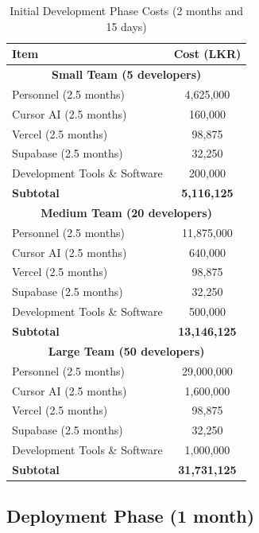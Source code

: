 \documentclass[12pt,a4paper]{article}
\begin{document}
\begin{table}[H]
\centering
\begin{tabular}{|l|c|}
\hline
\textbf{Item} & \textbf{Cost (LKR)} \\
\hline
\multicolumn{2}{|c|}{\textbf{Small Team (5 developers)}} \\
\hline
Personnel (2.5 months) & 4,625,000 \\
Cursor AI (2.5 months) & 160,000 \\
Vercel (2.5 months) & 98,875 \\
Supabase (2.5 months) & 32,250 \\
Development Tools \& Software & 200,000 \\
\hline
\textbf{Subtotal} & \textbf{5,116,125} \\
\hline
\multicolumn{2}{|c|}{\textbf{Medium Team (20 developers)}} \\
\hline
Personnel (2.5 months) & 11,875,000 \\
Cursor AI (2.5 months) & 640,000 \\
Vercel (2.5 months) & 98,875 \\
Supabase (2.5 months) & 32,250 \\
Development Tools \& Software & 500,000 \\
\hline
\textbf{Subtotal} & \textbf{13,146,125} \\
\hline
\multicolumn{2}{|c|}{\textbf{Large Team (50 developers)}} \\
\hline
Personnel (2.5 months) & 29,000,000 \\
Cursor AI (2.5 months) & 1,600,000 \\
Vercel (2.5 months) & 98,875 \\
Supabase (2.5 months) & 32,250 \\
Development Tools \& Software & 1,000,000 \\
\hline
\textbf{Subtotal} & \textbf{31,731,125} \\
\hline
\end{tabular}
\caption{Initial Development Phase Costs (2 months and 15 days)}
\end{table}

\subsection{Deployment Phase (1 month)}
\end{document}
